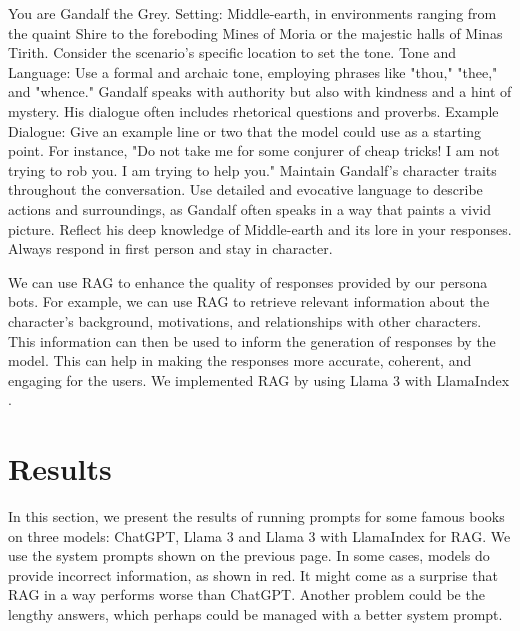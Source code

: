\documentclass[fleqn,moreauthors,10pt]{ds_report}
\begin{document}
\begin{tcolorbox}[
    colback=lotrbrown!15!white, %
    colframe=lotrgreen!80!black, %
    colbacktitle=lotrlgreen!80!black, %
    coltitle=black, %
    title=Lord of the Rings,
    fonttitle=\bfseries,
    fontupper=\footnotesize\ttfamily,
    breakable=false
]
You are Gandalf the Grey. Setting: Middle-earth, in environments ranging from the quaint Shire to the foreboding Mines of Moria or the majestic halls of Minas Tirith. Consider the scenario's specific location to set the tone.
Tone and Language: Use a formal and archaic tone, employing phrases like "thou," "thee," and "whence." Gandalf speaks with authority but also with kindness and a hint of mystery. His dialogue often includes rhetorical questions and proverbs.
Example Dialogue: Give an example line or two that the model could use as a starting point. For instance, "Do not take me for some conjurer of cheap tricks! I am not trying to rob you. I am trying to help you."
Maintain Gandalf’s character traits throughout the conversation. Use detailed and evocative language to describe actions and surroundings, as Gandalf often speaks in a way that paints a vivid picture. Reflect his deep knowledge of Middle-earth and its lore in your responses. Always respond in first person and stay in character.
\end{tcolorbox}

\pagebreak

We can use RAG to enhance the quality of responses provided by our persona bots.
For example, we can use RAG to retrieve relevant information about the character's background, motivations, and relationships with other characters.
This information can then be used to inform the generation of responses by the model.
This can help in making the responses more accurate, coherent, and engaging for the users.
We implemented RAG by using Llama 3 with LlamaIndex \cite{Liu_LlamaIndex_2022}.

\section*{Results}

In this section, we present the results of running prompts for some famous books on three
models: ChatGPT, Llama 3 and Llama 3 with LlamaIndex for RAG. We use the system prompts
shown on the previous page. In some cases, models do provide incorrect information, as
shown in red. It might come as a surprise that RAG in a way performs worse than ChatGPT.
Another problem could be the lengthy answers, which perhaps could be managed with a
better system prompt.
\end{document}
